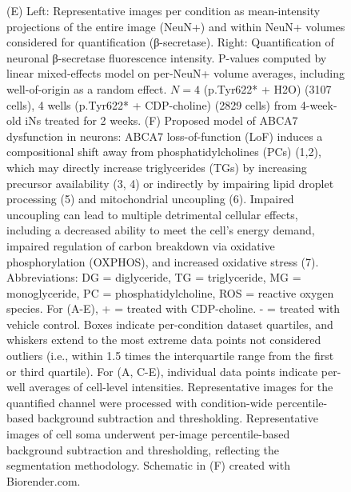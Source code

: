 \begin{figure}[ht]
{        (E) Left: Representative images per condition as mean-intensity projections of the entire image (NeuN+) and within NeuN+ volumes considered for quantification (β-secretase). Right: Quantification of neuronal β-secretase fluorescence intensity. P-values computed by linear mixed-effects model on per-NeuN+ volume averages, including well-of-origin as a random effect. $N = 4$ (p.Tyr622* + H2O) (3107 cells), 4 wells (p.Tyr622* + CDP-choline) (2829 cells) from 4-week-old iNs treated for 2 weeks. 
        (F) Proposed model of ABCA7 dysfunction in neurons: ABCA7 loss-of-function (LoF) induces a compositional shift away from phosphatidylcholines (PCs) (1,2), which may directly increase triglycerides (TGs) by increasing precursor availability (3, 4) or indirectly by impairing lipid droplet processing (5) and mitochondrial uncoupling (6). Impaired uncoupling can lead to multiple detrimental cellular effects, including a decreased ability to meet the cell’s energy demand, impaired regulation of carbon breakdown via oxidative phosphorylation (OXPHOS), and increased oxidative stress (7). Abbreviations: DG = diglyceride, TG = triglyceride, MG = monoglyceride, PC = phosphatidylcholine, ROS = reactive oxygen species. For (A-E),  + = treated with CDP-choline. - = treated with vehicle control. Boxes indicate per-condition dataset quartiles, and whiskers extend to the most extreme data points not considered outliers (i.e., within 1.5 times the interquartile range from the first or third quartile). For (A, C-E), individual data points indicate per-well averages of cell-level intensities. Representative images for the quantified channel were processed with condition-wide percentile-based background subtraction and thresholding. Representative images of cell soma underwent per-image percentile-based background subtraction and thresholding, reflecting the segmentation methodology. Schematic in (F) created with Biorender.com.
    }
    \label{fig:main_choline}
\end{figure}
